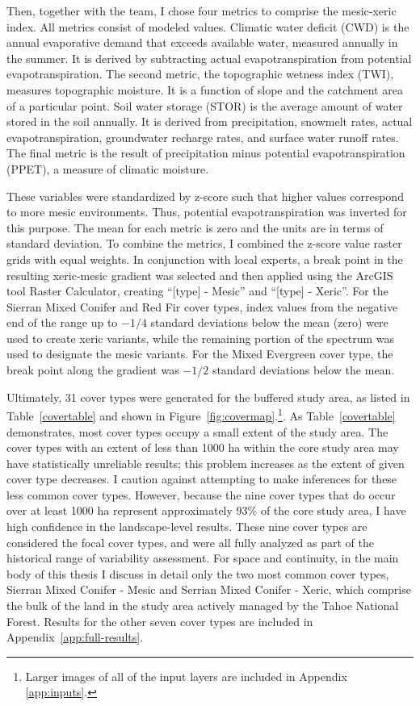 Then, together with the team, I chose four metrics to comprise the mesic-xeric index. All metrics consist of modeled values. Climatic water deficit (CWD) is the annual evaporative demand that exceeds available water, measured annually in the summer. It is derived by subtracting actual evapotranspiration from potential evapotranspiration. The second metric, the topographic wetness index (TWI), measures topographic moisture. It is a function of slope and the catchment area of a particular point. Soil water storage (STOR) is the average amount of water stored in the soil annually. It is derived from precipitation, snowmelt rates, actual evapotranspiration, groundwater recharge rates, and surface water runoff rates. The final metric is the result of precipitation minus potential evapotranspiration (PPET), a measure of climatic moisture.

These variables were standardized by z-score such that higher values correspond to more mesic environments. Thus, potential evapotranspiration was inverted for this purpose. The mean for each metric is zero and the units are in terms of standard deviation. To combine the metrics, I combined the z-score value raster grids with equal weights. In conjunction with local experts, a break point in the resulting xeric-mesic gradient was selected and then applied using the ArcGIS tool Raster Calculator, creating ``[type] - Mesic'' and ``[type] - Xeric''. For the Sierran Mixed Conifer and Red Fir cover types, index values from the negative end of the range up to $-1/4$ standard deviations below the mean (zero) were used to create xeric variants, while the remaining portion of the spectrum was used to designate the mesic variants. For the Mixed Evergreen cover type, the break point along the gradient was $-1/2$ standard deviations below the mean. 


Ultimately, 31 cover types were generated for the buffered study area, as listed in Table~\ref{covertable} and shown in Figure~\ref{fig:covermap}.\footnote{Larger images of all of the input layers are included in Appendix \ref{app:inputs}.}. %
As Table~\ref{covertable} demonstrates, most cover types occupy a small extent of the study area. The cover types with an extent of less than 1000 ha within the core study area may have statistically unreliable results; this problem increases as the extent of given cover type decreases. I caution against attempting to make inferences for these less common cover types. However, because the nine cover types that do occur over at least 1000 ha represent approximately 93\% of the core study area, I have high confidence in the landscape-level results. These nine cover types are considered the focal cover types, and were all fully analyzed as part of the historical range of variability assessment. For space and continuity, in the main body of this thesis I discuss in detail only the two most common cover types, Sierran Mixed Conifer - Mesic and Serrian Mixed Conifer - Xeric, which comprise the bulk of the land in the study area actively managed by the Tahoe National Forest. Results for the other seven cover types are included in Appendix~\ref{app:full-results}. 




